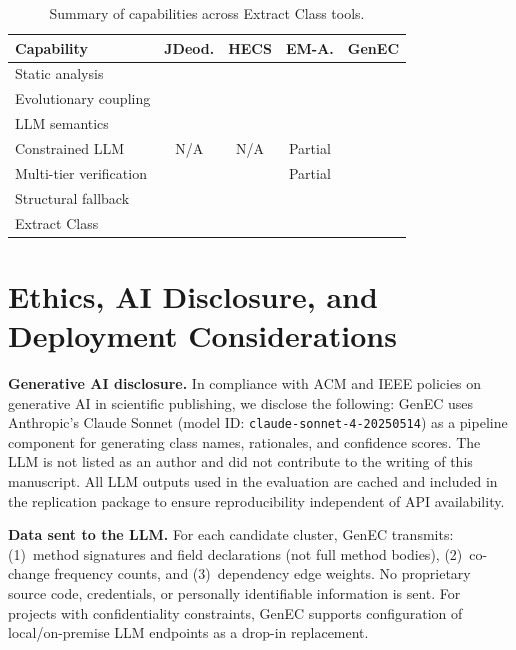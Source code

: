 \documentclass[sigconf]{acmart}
\newcommand{\cmark}{\ding{51}}
\newcommand{\xmark}{\ding{55}}
\begin{document}
\begin{table}[t]
\centering\small
\caption{Summary of capabilities across Extract Class tools.}
\label{tab:rw-summary}
\begin{tabular}{@{}lcccc@{}}
\toprule
\textbf{Capability} & \textbf{JDeod.} & \textbf{HECS} & \textbf{EM-A.} & \textbf{GenEC} \\
\midrule
Static analysis        & \cmark & \cmark & \cmark & \cmark \\
Evolutionary coupling  & \xmark & \xmark & \xmark & \cmark \\
LLM semantics          & \xmark & \xmark & \cmark & \cmark \\
Constrained LLM        & N/A    & N/A    & Partial & \cmark \\
Multi-tier verification & \xmark & \xmark & Partial & \cmark \\
Structural fallback    & \xmark & \xmark & \xmark & \cmark \\
Extract Class          & \cmark & \cmark & \xmark & \cmark \\
\bottomrule
\end{tabular}
\end{table}

\section{Ethics, AI Disclosure, and Deployment Considerations}
\label{sec:ethics}

\textbf{Generative AI disclosure.}  In compliance with ACM and IEEE policies on
generative AI in scientific publishing, we disclose the following: GenEC uses
Anthropic's Claude Sonnet (model ID: \texttt{claude-sonnet-4-20250514}) as a
pipeline component for generating class names, rationales, and confidence
scores. The LLM is not listed as an author and did not contribute to the writing
of this manuscript. All LLM outputs used in the evaluation are cached and
included in the replication package to ensure reproducibility independent of API
availability.

\textbf{Data sent to the LLM.}  For each candidate cluster, GenEC transmits:
(1)~method signatures and field declarations (not full method bodies),
(2)~co-change frequency counts, and (3)~dependency edge weights. No proprietary
source code, credentials, or personally identifiable information is sent. For
projects with confidentiality constraints, GenEC supports configuration of
local/on-premise LLM endpoints as a drop-in replacement.
\end{document}
